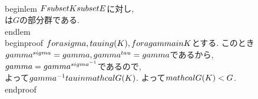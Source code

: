 {\\begin{lem}
 $F\\subset K\\subset E$に対し,
 \\[
  \\mathcal{G}(K)=\\{\\sigma\\in G\\mid \\fora \\gamma\\in K;\\gamma^{\\sigma}=\\gamma\\}
 \\]
 は$G$の部分群である.
\\end{lem}
\\begin{proof}
 $\\fora \\sigma, \\tau\\in g(K), \\fora \\gamma\\in K$とする. このとき
 $\\gamma^{\\sigma}=\\gamma, \\gamma^{\\tau}=\\gamma$であるから,
 $\\gamma=\\gamma^{\\sigma^{-1}}$であるので, 
 \\[
 \\gamma^{\\sigma^{-1}\\tau}=(\\gamma^{\\sigma^{-1}})^{\\tau}=\\gamma^{\\tau}=\\gamma
 \\]
 よって$\\gamma^{-1}\\tau\\in \\mathcal{G}(K)$. よって$\\mathcal{G}(K)<G$.
\\end{proof}
}
